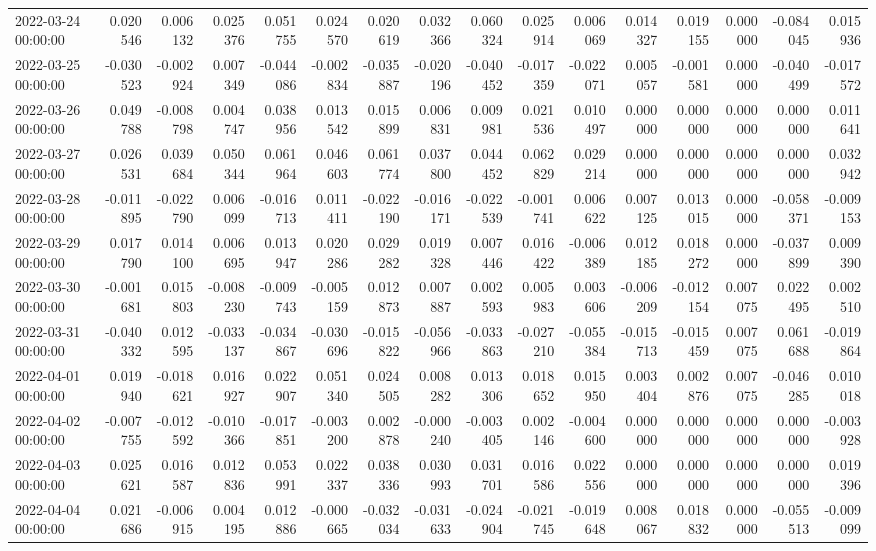 \begin{tabular}{lrrrrrrrrrrrrrrr}
2022-03-24 00:00:00 & 0.020546 & 0.006132 & 0.025376 & 0.051755 & 0.024570 & 0.020619 & 0.032366 & 0.060324 & 0.025914 & 0.006069 & 0.014327 & 0.019155 & 0.000000 & -0.084045 & 0.015936 \\
2022-03-25 00:00:00 & -0.030523 & -0.002924 & 0.007349 & -0.044086 & -0.002834 & -0.035887 & -0.020196 & -0.040452 & -0.017359 & -0.022071 & 0.005057 & -0.001581 & 0.000000 & -0.040499 & -0.017572 \\
2022-03-26 00:00:00 & 0.049788 & -0.008798 & 0.004747 & 0.038956 & 0.013542 & 0.015899 & 0.006831 & 0.009981 & 0.021536 & 0.010497 & 0.000000 & 0.000000 & 0.000000 & 0.000000 & 0.011641 \\
2022-03-27 00:00:00 & 0.026531 & 0.039684 & 0.050344 & 0.061964 & 0.046603 & 0.061774 & 0.037800 & 0.044452 & 0.062829 & 0.029214 & 0.000000 & 0.000000 & 0.000000 & 0.000000 & 0.032942 \\
2022-03-28 00:00:00 & -0.011895 & -0.022790 & 0.006099 & -0.016713 & 0.011411 & -0.022190 & -0.016171 & -0.022539 & -0.001741 & 0.006622 & 0.007125 & 0.013015 & 0.000000 & -0.058371 & -0.009153 \\
2022-03-29 00:00:00 & 0.017790 & 0.014100 & 0.006695 & 0.013947 & 0.020286 & 0.029282 & 0.019328 & 0.007446 & 0.016422 & -0.006389 & 0.012185 & 0.018272 & 0.000000 & -0.037899 & 0.009390 \\
2022-03-30 00:00:00 & -0.001681 & 0.015803 & -0.008230 & -0.009743 & -0.005159 & 0.012873 & 0.007887 & 0.002593 & 0.005983 & 0.003606 & -0.006209 & -0.012154 & 0.007075 & 0.022495 & 0.002510 \\
2022-03-31 00:00:00 & -0.040332 & 0.012595 & -0.033137 & -0.034867 & -0.030696 & -0.015822 & -0.056966 & -0.033863 & -0.027210 & -0.055384 & -0.015713 & -0.015459 & 0.007075 & 0.061688 & -0.019864 \\
2022-04-01 00:00:00 & 0.019940 & -0.018621 & 0.016927 & 0.022907 & 0.051340 & 0.024505 & 0.008282 & 0.013306 & 0.018652 & 0.015950 & 0.003404 & 0.002876 & 0.007075 & -0.046285 & 0.010018 \\
2022-04-02 00:00:00 & -0.007755 & -0.012592 & -0.010366 & -0.017851 & -0.003200 & 0.002878 & -0.000240 & -0.003405 & 0.002146 & -0.004600 & 0.000000 & 0.000000 & 0.000000 & 0.000000 & -0.003928 \\
2022-04-03 00:00:00 & 0.025621 & 0.016587 & 0.012836 & 0.053991 & 0.022337 & 0.038336 & 0.030993 & 0.031701 & 0.016586 & 0.022556 & 0.000000 & 0.000000 & 0.000000 & 0.000000 & 0.019396 \\
2022-04-04 00:00:00 & 0.021686 & -0.006915 & 0.004195 & 0.012886 & -0.000665 & -0.032034 & -0.031633 & -0.024904 & -0.021745 & -0.019648 & 0.008067 & 0.018832 & 0.000000 & -0.055513 & -0.009099 \\

\end{tabular}

